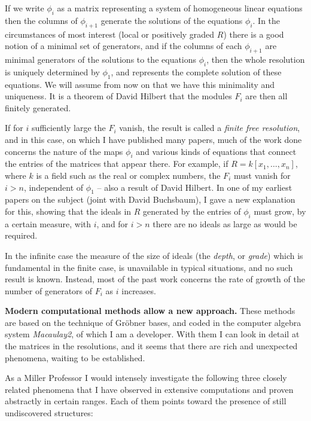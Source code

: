 \documentclass[11pt, oneside]{article}   	%
\begin{document}
If we write $\phi_{i}$
as a matrix representing a system of homogeneous linear equations then the columns of $\phi_{i+1}$ generate the solutions of the equations $\phi_{i}$. In the circumstances of most interest (local or positively graded $R$)
there is a good notion of a minimal set of generators, and if the columns of each $\phi_{i+1}$ 
are minimal generators of the solutions to the equations $\phi_{i}$, then the whole resolution is 
uniquely determined by $\phi_{1}$, and represents the complete solution of these equations. We
will assume from now on that we have this minimality and uniqueness. It is a theorem of David Hilbert that
the modules $F_{i}$ are then all finitely generated.

If for $i$ sufficiently large the $F_{i}$ vanish, the result is called a \emph{finite free resolution}, and in this case, on which I have published many papers, much of the work done concerns the nature of the maps $\phi_{i}$
and various kinds of equations that connect the entries of the matrices that appear there. For example, if
$R = k[x_{1}, \dots, x_{n}]$, where $k$ is a field such as the real or complex numbers, the $F_{i}$ must vanish
for $i>n$, independent of $\phi_{1}$ -- also a result of David Hilbert. In one of my earliest papers on the subject (joint with David Buchsbaum), I gave a new explanation for this, showing that the ideals in $R$ generated by the entries of $\phi_{i}$ must grow, by a certain measure, with $i$, and for $i>n$ there are no ideals as large as would be required.

In the infinite case the measure of the size of ideals (the \emph{depth}, or \emph{grade})
which is fundamental in the finite case, is unavailable in typical situations, and no such result is known. Instead, most of the past work  concerns the rate of growth of the number of generators of $F_{i}$ as $i$ increases. 
 
{\bf Modern computational methods allow a new approach.} These methods are based on the technique of Gr\"obner bases, and coded in the computer algebra system \emph{Macaulay2},  of which I am a developer. With them I can look in detail at the matrices in the resolutions, and it seems that there are rich and unexpected phenomena, waiting to be established.

As a Miller Professor I
would intensely investigate the following three closely related phenomena that I have observed in extensive computations and proven abstractly in certain ranges. Each of them points toward the presence of still
undiscovered structures:
\end{document}
